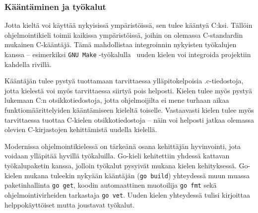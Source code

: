 \subsubsection{Kääntäminen ja työkalut}

Jotta kieltä voi käyttää nykyisissä ympäristöissä, sen tulee kääntyä C:ksi.
Tällöin ohjelmointikieli toimii kaikissa ympäristöissä, joihin on olemassa
C-standardin mukainen C-kääntäjä. Tämä mahdollistaa integroinnin nykyisten
työkalujen kanssa -- esimerkiksi \texttt{GNU Make} -työkalulla~\citep{gnumake}
uuden kielen voi integroida projektiin kahdella rivillä.


Kääntäjän tulee pystyä tuottamaan tarvittaessa ylläpitokelpoisia .c-tiedostoja,
jotta kielestä voi myös tarvittaessa siirtyä pois helposti.  Kielen tulee myös
pystyä lukemaan C:n otsikkotiedostoja, jotta ohjelmoijilta ei mene turhaan
aikaa funktiomäärittelyiden kääntämiseen kieleltä toiselle. Vastaavasti kielen
tulee myös tarvittaessa tuottaa C-kielen otsikkotiedostoja -- näin voi helposti
jatkaa olemassa olevien C-kirjastojen kehittämistä uudella kielellä.

%

Modernissa ohjelmointikielessä on tärkeänä osana kehittäjän hyvinvointi, jota
voidaan ylläpitää hyvillä työkaluilla. Go-kieli kehitettiin yhdessä kattavan
työkalupaketin kanssa, jolloin työkalut pysyivät mukana kielen kehityksessä.
Go-kielen mukana tuleekin nykyään kääntäjän (\texttt{go build}) yhteydessä muun
muassa paketinhallinta \texttt{go get}, koodin automaattinen muotoilija
\texttt{go fmt} sekä ohjelmointivirheiden tarkastaja \texttt{go vet}. Uuden
kielen yhteydessä tulisi kirjoittaa helppokäyttöiset mutta joustavat työkalut.



